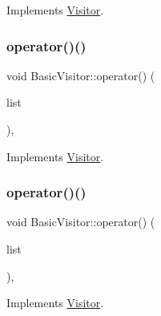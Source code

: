 Implements \hyperlink{struct_visitor_a36ea2fb9b8225f7b4c04c3d546c4608a}{Visitor}.

\mbox{\label{struct_basic_visitor_afc8e6a4fa1e993522b484308d3b1378d}} 
\subsubsection{\texorpdfstring{operator()()}{operator()()}\hspace{0.1cm}{\footnotesize\ttfamily [57/59]}}
{\footnotesize\ttfamily void Basic\+Visitor\+::operator() (\begin{DoxyParamCaption}\item[{const \hyperlink{struct_case_block}{Case\+Block} \&}]{list }\end{DoxyParamCaption})\hspace{0.3cm}{\ttfamily [inline]}, {\ttfamily [virtual]}}



Implements \hyperlink{struct_visitor_a6042d08a4d52ec6d3cd76251c88c5202}{Visitor}.

\mbox{\label{struct_basic_visitor_a350c9cf47d068cb7de9f4e4a92c07fc8}} 
\subsubsection{\texorpdfstring{operator()()}{operator()()}\hspace{0.1cm}{\footnotesize\ttfamily [58/59]}}
{\footnotesize\ttfamily void Basic\+Visitor\+::operator() (\begin{DoxyParamCaption}\item[{const \hyperlink{struct_source_elements}{Source\+Elements} \&}]{list }\end{DoxyParamCaption})\hspace{0.3cm}{\ttfamily [inline]}, {\ttfamily [virtual]}}



Implements \hyperlink{struct_visitor_ad9a1464cbbd0ab4e528ac4d22c056647}{Visitor}.

\mbox{\label{struct_basic_visitor_ad8960cea4118164c4c913b2b3a42ec4a}} 
